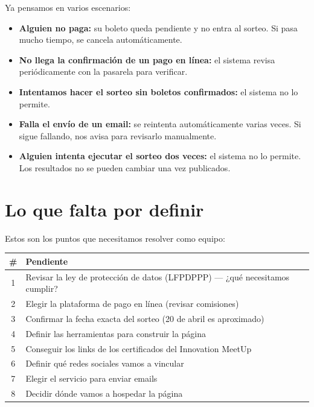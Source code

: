 \documentclass[12pt,a4paper]{article}
\begin{document}
Ya pensamos en varios escenarios:

\begin{itemize}[leftmargin=2em]
    \item \textbf{Alguien no paga:} su boleto queda pendiente y no entra al sorteo. Si pasa mucho tiempo, se cancela automáticamente.
    \item \textbf{No llega la confirmación de un pago en línea:} el sistema revisa periódicamente con la pasarela para verificar.
    \item \textbf{Intentamos hacer el sorteo sin boletos confirmados:} el sistema no lo permite.
    \item \textbf{Falla el envío de un email:} se reintenta automáticamente varias veces. Si sigue fallando, nos avisa para revisarlo manualmente.
    \item \textbf{Alguien intenta ejecutar el sorteo dos veces:} el sistema no lo permite. Los resultados no se pueden cambiar una vez publicados.
\end{itemize}

\section{Lo que falta por definir}

Estos son los puntos que necesitamos resolver como equipo:

\begin{table}[H]
\centering
\begin{tabularx}{\textwidth}{cX}
\toprule
\textbf{\#} & \textbf{Pendiente} \\
\midrule
1 & Revisar la ley de protección de datos (LFPDPPP) --- ¿qué necesitamos cumplir? \\
2 & Elegir la plataforma de pago en línea (revisar comisiones) \\
3 & Confirmar la fecha exacta del sorteo (20 de abril es aproximado) \\
4 & Definir las herramientas para construir la página \\
5 & Conseguir los links de los certificados del Innovation MeetUp \\
6 & Definir qué redes sociales vamos a vincular \\
7 & Elegir el servicio para enviar emails \\
8 & Decidir dónde vamos a hospedar la página \\
\bottomrule
\end{tabularx}
\end{table}
\end{document}
